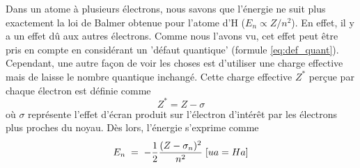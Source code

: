 Dans un atome à plusieurs électrons, nous savons que l'énergie ne suit plus exactement la loi de Balmer obtenue pour l'atome d'H ($E_n \propto Z/n^2$). En effet, il y a un effet dû aux autres électrons. Comme nous l'avons vu, cet effet peut être pris en compte en considérant un 'défaut quantique' (formule \ref{eq:def_quant}). Cependant, une autre façon de voir les choses est d'utiliser une charge effective mais de laisse le nombre quantique inchangé. Cette charge effective $Z^{*}$ perçue par chaque électron est définie comme $$ Z^{*}=Z-\sigma $$ où $\sigma$ représente l'effet d'écran produit sur l'électron d'intérêt par les électrons plus proches du noyau. Dès lors, l'énergie s'exprime comme
\begin{equation}
    E_n \; = \; -\dfrac{1}{2} \dfrac{(Z-\sigma_n)^2}{n^2} \; [ua = Ha]
    \label{eq:energie_effective}
\end{equation}


